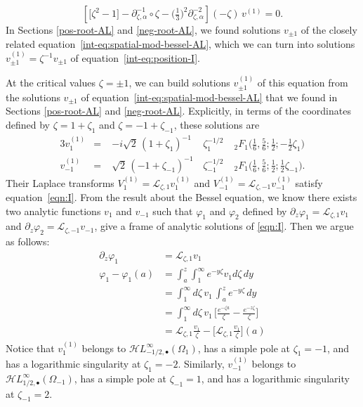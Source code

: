 \documentclass{article}
\newcommand{\singexp}[2]{\mathcal{H}L^\infty_{#1, #2}}
\newcommand{\singexpalg}[1]{\singexp{#1}{\bullet}}
\newcommand{\fracderiv}[3]{\partial^{#1}_{#2, #3}}
\newcommand{\laplace}{\mathcal{L}}
\theoremstyle{definition}
\theoremstyle{plain}
\newenvironment{verify}{\color{ForestGreen}}{\color{black}}
\begin{document}
\begin{equation}\label{int-eq:position-I}
\left[ \big[ \zeta^2 - 1 \big] - \fracderiv{-1}{\zeta}{\alpha} \circ \zeta - \big(\tfrac{1}{3}\big)^2 \fracderiv{-2}{\zeta}{\alpha} \right] (-\zeta)\,v^{(1)} = 0.
\end{equation}
In Sections \ref{pos-root-AL} and \ref{neg-root-AL}, we found solutions $v_{\pm 1}$ of the closely related equation~\eqref{int-eq:spatial-mod-bessel-AL}, which we can turn into solutions $v^{(1)}_{\pm 1} = \zeta^{-1} v_{\pm 1}$ of equation~\eqref{int-eq:position-I}.

At the critical values $\zeta = \pm 1$, we can build solutions $v^{(1)}_{\pm 1}$ of this equation from the solutions $v_{\pm 1}$ of equation~\eqref{int-eq:spatial-mod-bessel-AL} that we found in Sections \ref{pos-root-AL} and \ref{neg-root-AL}. Explicitly, in terms of the coordinates defined by $\zeta = 1 + \zeta_1$ and $\zeta = -1 + \zeta_{-1}$, these solutions are
\begin{alignat*}{3}
v^{(1)}_1 &=\;& -i\sqrt{2}\,(1 + \zeta_1)^{-1} &\,\zeta_1^{-1/2} &\;{}_2F_1\big(\tfrac{1}{6},\tfrac{5}{6};\tfrac{1}{2};-\tfrac{1}{2}\zeta_{1}\big) \\
v^{(1)}_{-1} &=\;& \sqrt{2}\,(-1 + \zeta_{-1})^{-1} &\,\zeta_{-1}^{-1/2} &\;{}_2F_1\big(\tfrac{1}{6},\tfrac{5}{6};\tfrac{1}{2};\tfrac{1}{2}\zeta_{-1}\big).
\end{alignat*}
Their Laplace transforms $V^{(1)}_1 = \laplace_{\zeta, 1} v^{(1)}_1$ and $V^{(1)}_{-1} = \laplace_{\zeta, -1} v^{(1)}_{-1}$ satisfy equation~\eqref{eqn:I}.
\begin{verify}
From the result about the Bessel equation, we know there exists two analytic functions $v_1$ and $v_{-1}$ such that $\varphi_1$ and $\varphi_2$ defined by $\partial_z\varphi_1=\laplace_{\zeta,1}v_1$ and $\partial_z\varphi_2=\laplace_{\zeta,-1}v_{-1}$, give a frame of analytic solutions of \eqref{eqn:I}. Then we argue as follows:
\begin{align*}
    \partial_z\varphi_1&=\laplace_{\zeta,1}v_1\\
    \varphi_1-\varphi_1(a)&=\int_a^z\int_1^{\infty}e^{-y\zeta} v_1 d\zeta \, dy\\
    &=\int_1^{\infty}d\zeta\,  v_1 \, \int_a^ze^{-y\zeta}  \, dy\\
    &=\int_1^{\infty}d\zeta\,  v_1 \, \Big[\frac{e^{-\zeta a}}{\zeta}-\frac{e^{-z\zeta}}{\zeta}\Big]\\
    &=\laplace_{\zeta,1} \tfrac{v_1}{\zeta}-\Big[\laplace_{\zeta,1}\tfrac{v_1}{\zeta}\Big](a)
\end{align*}
\end{verify}
Notice that $v^{(1)}_1$ belongs to $\singexpalg{-1/2}(\Omega_1)$, has a simple pole at $\zeta_1 = -1$, and has a logarithmic singularity at $\zeta_1 = -2$. Similarly, $v^{(1)}_{-1}$ belongs to $\singexpalg{1/2}(\Omega_{-1})$, has a simple pole at $\zeta_{-1} = 1$, and has a logarithmic singularity at $\zeta_{-1} = 2$.
\end{document}
